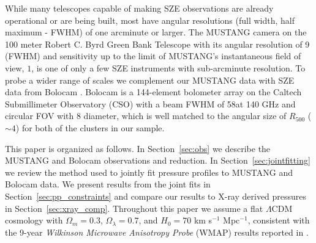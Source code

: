 While many telescopes capable of making SZE observations are already operational or are being built, most have
angular resolutions (full width, half maximum - FWHM) of one arcminute or larger. The MUSTANG camera \citep{dicker2008}
on the 100 meter Robert C. Byrd Green Bank Telescope \citep[GBT, ][]{jewell2004} with its angular resolution of 9\asec 
(FWHM) and sensitivity up to the limit of MUSTANG's instantaneous field of view, $1$\amin, 
is one of only a few SZE instruments with sub-arcminute resolution.
To probe a wider range of scales we complement our MUSTANG data with SZE data from Bolocam \citep{glenn1998}. 
Bolocam is a 144-element bolometer
array on the Caltech Submillimeter Observatory (CSO) with a beam FWHM of 58\asecs at 140 GHz and circular FOV with 8\amins 
diameter, which is well matched to the angular size of $R_{500}$ ($\sim 4$\amin) for both of the clusters in our sample. 


This paper is organized as follows. In Section~\ref{sec:obs} we describe the MUSTANG and Bolocam observations and reduction. 
In Section~\ref{sec:jointfitting} we review the method used to jointly fit pressure profiles to MUSTANG and Bolocam data. We
present results from the joint fits in Section~\ref{sec:pp_constraints} and compare our results to X-ray derived pressures 
in Section~\ref{sec:xray_comp}. 
Throughout this paper we assume a flat $\Lambda$CDM cosmology with $\Omega_m = 0.3$, $\Omega_{\lambda} = 0.7$, and $H_0 = 70$ 
km s$^{-1}$ Mpc$^{-1}$, consistent with the 9-year \emph{Wilkinson Microwave Anisotropy Probe} (WMAP) results reported in
 \cite{hinshaw2013}.
